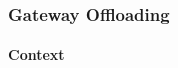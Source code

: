\documentclass{bmcart}
\begin{document}
        
        





        
        


        
        

        

        
        

        

             
        

        


\subsubsection{Gateway Offloading}

\paragraph{Context}
\end{document}

